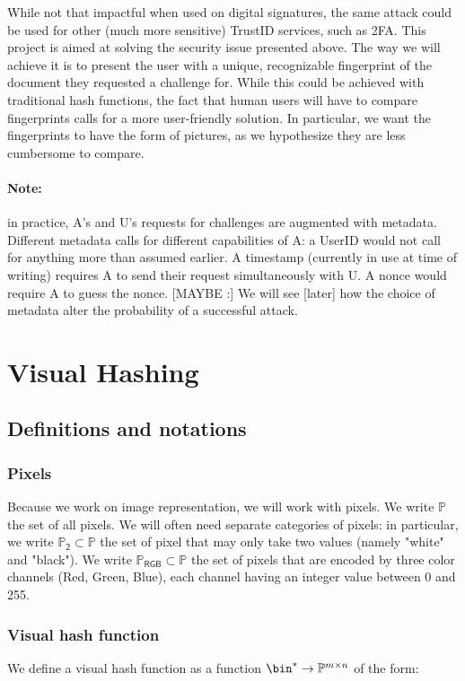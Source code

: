 \documentclass{article}
\newcommand{\bb}{\mathbb}
\newcommand{\prgb}{\bb P _\mathsf{RGB}}
\newcommand{\pb}{\bb P _ \mathsf{2}}
\newcommand{\pp}{\bb P}
\newcommand{\pmn}{\pp^{m \times n}}
\begin{document}
While not that impactful when used on digital signatures, the same attack could be used for other (much more sensitive) TrustID services, such as 2FA. This project is aimed at solving the security issue presented above. The way we will achieve it is to present the user with a unique, recognizable fingerprint of the document they requested a challenge for. While this could be achieved with traditional hash functions, the fact that human users will have to compare fingerprints calls for a more user-friendly solution. In particular, we want the fingerprints to have the form of pictures, as we hypothesize they are
less cumbersome to compare.

\paragraph{Note:} in practice, A's and U's requests for challenges are augmented with metadata. Different metadata calls for different capabilities of A: a UserID would not call for anything more than assumed earlier. A timestamp (currently in use at time of writing) requires A to send their request simultaneously with U. A nonce would require A to guess the nonce. [MAYBE :] We will see [later] how the choice of metadata alter the probability of a successful attack.

\section{Visual Hashing}

\subsection{Definitions and notations}
\subsubsection{Pixels}
Because we work on image representation, we will work with pixels. We write $\pp$ the set of all pixels. We will often need separate categories of pixels: in particular, we write $\pb \subset \mathbb P$ the set of pixel that may only take two values (namely "white" and "black"). We write $ \prgb \subset \pp$ the set of pixels that are encoded by three color channels (Red, Green, Blue), each channel having an integer value between 0 and 255.
\subsubsection{Visual hash function}
We define a visual hash function as a function $\bin^* \rightarrow \pmn$ of the form: 
\end{document}
